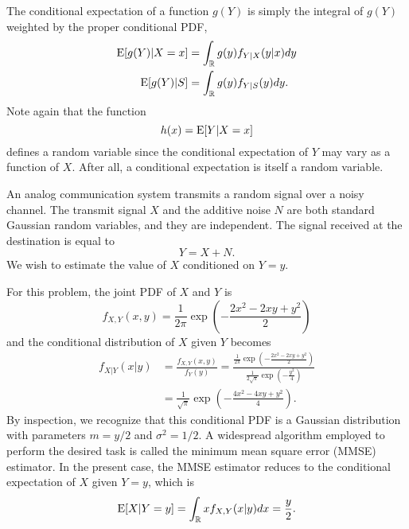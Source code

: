 The conditional expectation of a function $g(Y)$ is simply the integral of $g(Y)$ weighted by the proper conditional PDF,
\begin{align*}
\mathrm{E} [g(Y) | X = x] &= \int_{\mathbb{R}} g(y) f_{Y|X} (y|x) dy \\
\mathrm{E} [g(Y) | S] &= \int_{\mathbb{R}} g(y) f_{Y|S} (y) dy .
\end{align*}
Note again that the function
\begin{equation*}
h(x) = \mathrm{E} [Y | X=x]
\end{equation*}
defines a random variable since the conditional expectation of $Y$ may vary as a function of $X$.
After all, a conditional expectation is itself a random variable.

\begin{example}
An analog communication system transmits a random signal over a noisy channel.
The transmit signal $X$ and the additive noise $N$ are both standard Gaussian random variables, and they are independent.
The signal received at the destination is equal to
\begin{equation*}
Y = X + N .
\end{equation*}
We wish to estimate the value of $X$ conditioned on $Y = y$.

For this problem, the joint PDF of $X$ and $Y$ is
\begin{equation*}
f_{X,Y} (x,y) = \frac{1}{2 \pi}
\exp \left( - \frac{2 x^2 - 2 xy + y^2}{2}  \right)
\end{equation*}
and the conditional distribution of $X$ given $Y$ becomes
\begin{equation*}
\begin{split}
f_{X|Y} (x|y) &= \frac{f_{X,Y} (x,y)}{f_{Y} (y)}
= \frac{ \frac{1}{2 \pi} \exp \left( - \frac{2 x^2 - 2 xy + y^2}{2}  \right) }
{ \frac{1}{2 \sqrt{\pi}} \exp \left( - \frac{y^2}{4}  \right) } \\
&=\frac{1}{\sqrt{\pi}}
\exp \left( - \frac{4 x^2 - 4 xy + y^2}{4}  \right) .
\end{split}
\end{equation*}
By inspection, we recognize that this conditional PDF is a Gaussian distribution with parameters $m = y/2$ and $\sigma^2 = 1/2$.
A widespread algorithm employed to perform the desired task is called the minimum mean square error (MMSE) estimator.
In the present case, the MMSE estimator reduces to the conditional expectation of $X$ given $Y = y$, which is
\begin{equation*}
\mathrm{E} [X | Y = y] = \int_{\mathbb{R}} x f_{X,Y}(x|y) dx
= \frac{y}{2} .
\end{equation*}
\end{example}


